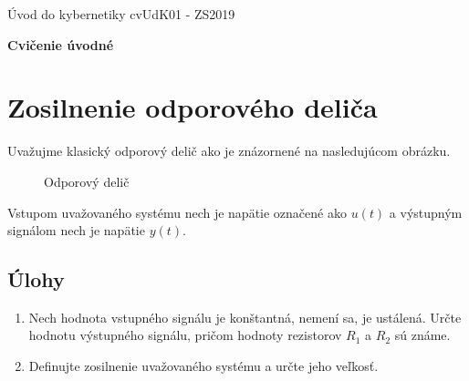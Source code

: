 \documentclass[a4paper, 10pt, ]{article}
\def\oznacenieCasti{cvUdK01 - ZS2019}
\begin{document}
\fontsize{12pt}{22pt}\selectfont

\centerline{\textsf{Úvod do kybernetiky} \hfill \textsf{\oznacenieCasti}}

\fontsize{18pt}{22pt}\selectfont

\begin{flushleft}
    \textbf{\textsf{Cvičenie úvodné}}
\end{flushleft}

\normalsize

\bigskip

\tableofcontents

\bigskip

\vspace{18pt}






\section{Zosilnenie odporového deliča}


Uvažujme klasický odporový delič ako je znázornené na nasledujúcom obrázku.


\begin{figure}[!h]
	\centering

	\makebox[\textwidth][c]{%
	
	}

	\caption{Odporový delič}
	\label{OdporovyDelic}
\end{figure}



\noindent
Vstupom uvažovaného systému nech je napätie označené ako $u(t)$ a výstupným signálom nech je napätie $y(t)$.




\subsection{Úlohy}

\begin{enumerate}

	\item Nech hodnota vstupného signálu je konštantná, nemení sa, je ustálená. Určte hodnotu výstupného signálu, pričom hodnoty rezistorov $R_1$ a $R_2$ sú známe.

    \item Definujte zosilnenie uvažovaného systému a určte jeho veľkosť.

\end{enumerate}
\end{document}
